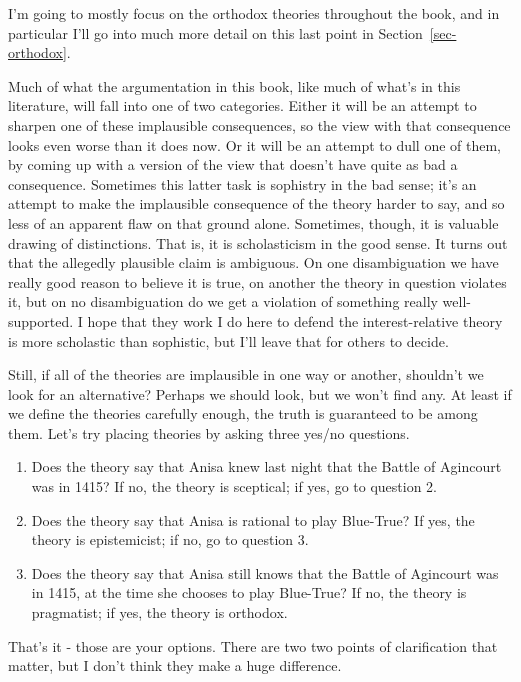 \documentclass[
  12pt,
  letterpaper,
]{scrbook}
\providecommand{\tightlist}{%
  \setlength{\itemsep}{0pt}\setlength{\parskip}{0pt}}\usepackage{longtable,booktabs,array}
\begin{document}
I'm going to mostly focus on the orthodox theories throughout the book,
and in particular I'll go into much more detail on this last point in
Section~\ref{sec-orthodox}.

Much of what the argumentation in this book, like much of what's in this
literature, will fall into one of two categories. Either it will be an
attempt to sharpen one of these implausible consequences, so the view
with that consequence looks even worse than it does now. Or it will be
an attempt to dull one of them, by coming up with a version of the view
that doesn't have quite as bad a consequence. Sometimes this latter task
is sophistry in the bad sense; it's an attempt to make the implausible
consequence of the theory harder to say, and so less of an apparent flaw
on that ground alone. Sometimes, though, it is valuable drawing of
distinctions. That is, it is scholasticism in the good sense. It turns
out that the allegedly plausible claim is ambiguous. On one
disambiguation we have really good reason to believe it is true, on
another the theory in question violates it, but on no disambiguation do
we get a violation of something really well-supported. I hope that they
work I do here to defend the interest-relative theory is more scholastic
than sophistic, but I'll leave that for others to decide.

Still, if all of the theories are implausible in one way or another,
shouldn't we look for an alternative? Perhaps we should look, but we
won't find any. At least if we define the theories carefully enough, the
truth is guaranteed to be among them. Let's try placing theories by
asking three yes/no questions.

\begin{enumerate}
\def\labelenumi{\arabic{enumi}.}
\tightlist
\item
  Does the theory say that Anisa knew last night that the Battle of
  Agincourt was in 1415? If no, the theory is sceptical; if yes, go to
  question 2.
\item
  Does the theory say that Anisa is rational to play Blue-True? If yes,
  the theory is epistemicist; if no, go to question 3.
\item
  Does the theory say that Anisa still knows that the Battle of
  Agincourt was in 1415, at the time she chooses to play Blue-True? If
  no, the theory is pragmatist; if yes, the theory is orthodox.
\end{enumerate}

That's it - those are your options. There are two two points of
clarification that matter, but I don't think they make a huge
difference.
\end{document}
